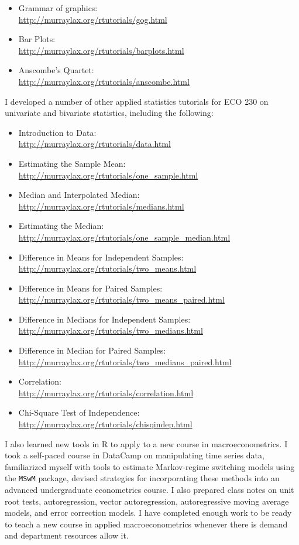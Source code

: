 \documentclass[11pt]{article}
\newcommand{\bi}{\begin{itemize}}
\newcommand{\ei}{\end{itemize}}
\begin{document}
\bi
\itemsep0em 
\item Grammar of graphics:\\ \url{http://murraylax.org/rtutorials/gog.html}
\item Bar Plots:\\ \url{http://murraylax.org/rtutorials/barplots.html}
\item Anscombe's Quartet:\\ \url{http://murraylax.org/rtutorials/anscombe.html}
\ei

I developed a number of other applied statistics tutorials for ECO 230 on univariate and bivariate statistics, including the following:

\bi
\itemsep0em 
\item Introduction to Data:\\ \url{http://murraylax.org/rtutorials/data.html}
\item Estimating the Sample Mean:\\ \url{http://murraylax.org/rtutorials/one_sample.html}
\item Median and Interpolated Median:\\ \url{http://murraylax.org/rtutorials/medians.html}
\item Estimating the Median:\\ \url{http://murraylax.org/rtutorials/one_sample_median.html}
\item Difference in Means for Independent Samples:\\ \url{http://murraylax.org/rtutorials/two_means.html}
\item Difference in Means for Paired Samples:\\ \url{http://murraylax.org/rtutorials/two_means_paired.html}
\item Difference in Medians for Independent Samples:\\ \url{http://murraylax.org/rtutorials/two_medians.html}
\item Difference in Median for Paired Samples:\\ \url{http://murraylax.org/rtutorials/two_medians_paired.html}
\item Correlation:\\ \url{http://murraylax.org/rtutorials/correlation.html}
\item Chi-Square Test of Independence:\\ \url{http://murraylax.org/rtutorials/chisqindep.html}
\ei

I also learned new tools in R to apply to a new course in macroeconometrics.  I took a self-paced course in DataCamp on manipulating time series data, familiarized myself with tools to estimate Markov-regime switching models using the \texttt{MSwM} package, devised strategies for incorporating these methods into an advanced undergraduate econometrics course. I also prepared class notes on unit root tests, autoregression, vector autoregression, autoregressive moving average models, and error correction models. I have completed enough work to be ready to teach a new course in applied macroeconometrics whenever there is demand and department resources allow it.
\end{document}
